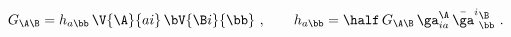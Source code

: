 \begin{equation} \label{G,h}
  G_{\A\B} = h_{a\bb}\, \V{\A}{ai}\, \bV{\B i}{\bb}\ ,\qquad h_{a\bb} =
  \half\, G_{\A\B}\, \ga_{ia}^\A\, \bar{\ga}^i{}_\bb^\B\ .
 \end{equation}

